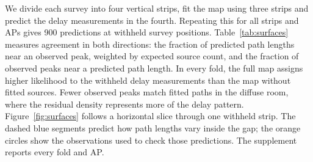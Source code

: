 We divide each survey into four vertical strips, fit the map using three strips and predict the delay measurements in the fourth. Repeating this for all strips and APs gives 900 predictions at withheld survey positions. Table~\ref{tab:surfaces} measures agreement in both directions: the fraction of predicted path lengths near an observed peak, weighted by expected source count, and the fraction of observed peaks near a predicted path length. In every fold, the full map assigns higher likelihood to the withheld delay measurements than the map without fitted sources. Fewer observed peaks match fitted paths in the diffuse room, where the residual density represents more of the delay pattern. Figure~\ref{fig:surfaces} follows a horizontal slice through one withheld strip. The dashed blue segments predict how path lengths vary inside the gap; the orange circles show the observations used to check those predictions. The supplement reports every fold and AP.
